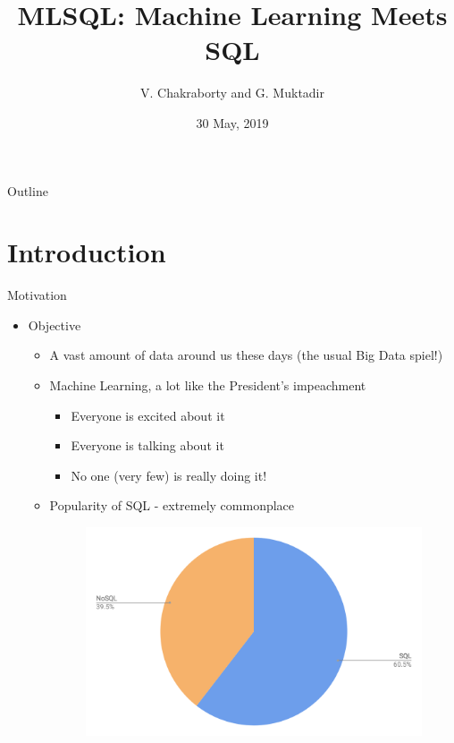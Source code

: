 \documentclass[handout, xcolor={dvipsnames}]{beamer}
\title{MLSQL: Machine Learning Meets SQL}
\subtitle{}
\author{V. Chakraborty and G. Muktadir
}
\institute[Uni. of California] %
{
  \inst{}%
  \textit{CMPS 203, Spring 2019}\\
 }
\date{30 May, 2019}
\begin{document}
\begin{frame}
  \titlepage
\end{frame}

\begin{frame}{Outline}
  \tableofcontents
\end{frame}

\section{Introduction}
\begin{frame}{Motivation}{}
  \begin{itemize}
  \item<1-> {
   Objective
   \begin{itemize}
       \item<1->  A vast amount of data around us these days (the usual Big Data spiel!)
       \vspace{.2in}
       \item<2-> Machine Learning, a lot like the President's impeachment
        \begin{itemize}
            \item<3-> Everyone is excited about it 
            \item<4-> Everyone is talking about it
            \item<5-> No one (very few) is really doing it!
        \end{itemize}
        \vspace{.2in}
       \item<6-> Popularity of SQL - extremely commonplace
       \begin{figure}
           \centering
           \includegraphics[scale = 0.1]{SQL_no.png}

\end{figure}
\end{itemize}}
\end{itemize}
\end{frame}
\end{document}
